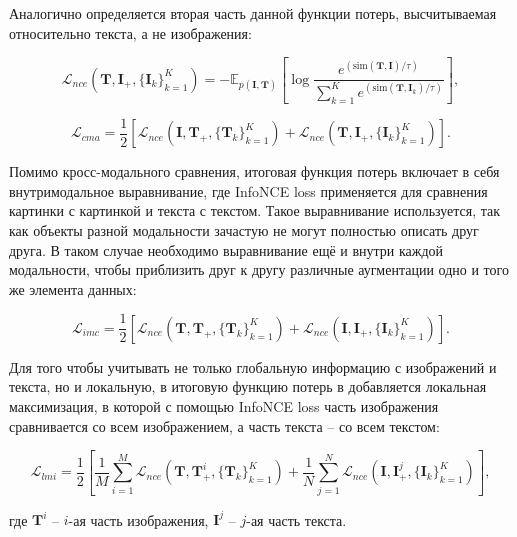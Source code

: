 \documentclass[a4paper, 14pt]{article}
\begin{document}
Аналогично определяется вторая часть данной функции потерь, высчитываемая относительно текста, а не изображения:

\begin{equation}
    \mathcal{L}_{nce}(\mathbf{T}, \mathbf{I}_+, \{\mathbf{I}_k\}_{k=1}^K) = - \mathbb{E}_{p(\mathbf{I}, \mathbf{T})}\left[\log\frac{e^{(\text{sim}(\mathbf{T}, \mathbf{I})/\tau)}}{\sum_{k=1}^Ke^{(\text{sim}(\mathbf{T}, \mathbf{I}_k)/\tau)}}\right],
\end{equation}

\begin{equation}\label{eq:cma}
    \mathcal{L}_{cma} = \frac{1}{2}[\mathcal{L}_{nce}(\mathbf{I}, \mathbf{T}_+, \{\mathbf{T}_k\}_{k=1}^K) + \mathcal{L}_{nce}(\mathbf{T}, \mathbf{I}_+, \{\mathbf{I}_k\}_{k=1}^K)].
\end{equation}

Помимо кросс-модального сравнения, итоговая функция потерь включает в себя внутримодальное выравнивание, где InfoNCE loss применяется для сравнения картинки с картинкой и текста с текстом. Такое выравнивание используется, так как объекты разной модальности зачастую не могут полностью описать друг друга. В таком случае необходимо выравнивание ещё и внутри каждой модальности, чтобы приблизить друг к другу различные аугментации одно и того же элемента данных:

\begin{equation}\label{eq:imc}
    \mathcal{L}_{imc} = \frac{1}{2}[\mathcal{L}_{nce}(\mathbf{T}, \mathbf{T}_+, \{\mathbf{T}_k\}_{k=1}^K) + \mathcal{L}_{nce}(\mathbf{I}, \mathbf{I}_+, \{\mathbf{I}_k\}_{k=1}^K)].
\end{equation}

Для того чтобы учитывать не только глобальную информацию с изображений и текста, но и локальную, в итоговую функцию потерь в \citep{TCL} добавляется локальная максимизация, в которой с помощью InfoNCE loss часть изображения сравнивается со всем изображением, а часть текста -- со всем текстом:

\begin{equation}\label{eq:lmi}
    \mathcal{L}_{lmi} = \frac{1}{2}\left[\frac{1}{M}\sum\limits_{i=1}^M\mathcal{L}_{nce}(\mathbf{T}, \mathbf{T}_+^i, \{\mathbf{T}_k\}_{k=1}^K) + \frac{1}{N}\sum\limits_{j=1}^N\mathcal{L}_{nce}(\mathbf{I}, \mathbf{I}_+^j, \{\mathbf{I}_k\}_{k=1}^K)\right],
\end{equation}

\noindent где $\mathbf{T}^i$ -- $i$-ая часть изображения, $\mathbf{I}^j$ -- $j$-ая часть текста.
\end{document}
